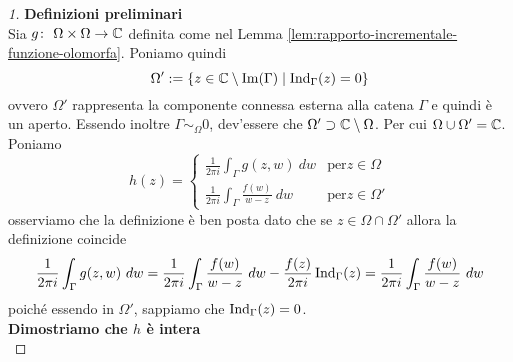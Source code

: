 \begin{proof}[1]

    \textbf{Definizioni preliminari}\\

    Sia $g \colon\ \Omega\times\Omega \rightarrow \mathbb{C}$ definita come nel Lemma
    \ref{lem:rapporto-incrementale-funzione-olomorfa}. 
    Poniamo quindi 
    \begin{equation*}
        \Omega' := \left\{ z \in \mathbb{C} \setminus \operatorname{Im}(\Gamma) \mid
            \operatorname{Ind}_\Gamma(z) = 0  \right\}
    \end{equation*}
    ovvero $\Omega'$ rappresenta la componente connessa esterna alla catena
    $\Gamma$ e quindi è un aperto. %
    Essendo inoltre $\Gamma \sim_\Omega 0$, dev'essere che $\Omega' \supset
    \mathbb{C} \setminus \Omega$.  Per cui $\Omega \cup \Omega' = \mathbb{C}$. Poniamo 
    \begin{equation*}
      h(z) = \begin{cases}
        \frac{1}{2\pi i} \int_\Gamma g(z,w)\ dw  & \text{per} z \in \Omega \\
        \frac{1}{2\pi i} \int_\Gamma \frac{f(w)}{w-z}\ dw \ & \text{per}
        z \in \Omega' 
      \end{cases}
    \end{equation*}
    osserviamo che la definizione è ben posta dato che se $z \in \Omega \cap
    \Omega'$ allora la definizione coincide
    \begin{equation*}
      \frac{1}{2\pi i} \int_\Gamma g(z,w)\ dw =  
            \frac{1}{2\pi i} \int_\Gamma \frac{f(w)}{w-z}\ dw - 
            \frac{f(z)}{2\pi i} \operatorname{Ind}_\Gamma(z) 
            = \frac{1}{2\pi i} \int_\Gamma \frac{f(w)}{w-z}\ dw        
    \end{equation*}
    poiché essendo in $\Omega'$, sappiamo che $\operatorname{Ind}_\Gamma(z)
    = 0$. \\
    
    \textbf{Dimostriamo che $h$ è intera}\\


\end{proof}
